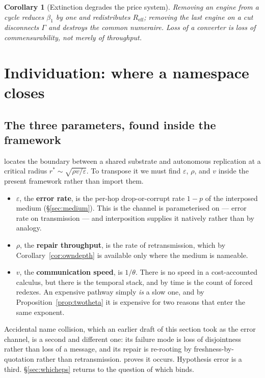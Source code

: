 \documentclass[11pt]{article}
\theoremstyle{plain}
\newtheorem{corollary}[theorem]{Corollary}
\theoremstyle{definition}
\theoremstyle{remark}
\newcommand{\Reff}{R_{\mathrm{eff}}}
\newcommand{\bt}{\beta_1}
\begin{document}
\begin{corollary}[Extinction degrades the price system]
Removing an engine from a cycle reduces $\bt$ by one and redistributes
$\Reff$; removing the last engine on a cut disconnects $\Gamma$ and
destroys the common numeraire. Loss of a converter is loss of
commensurability, not merely of throughput.
\end{corollary}

\section{Individuation: where a namespace closes}
\label{sec:indiv}

\subsection{The three parameters, found inside the framework}

\cite{compaut} locates the boundary between a shared substrate and
autonomous replication at a critical radius $r^\ast \sim
\sqrt{\rho v/\varepsilon}$. To transpose it we must find $\varepsilon$,
$\rho$, and $v$ inside the present framework rather than import them.

\begin{itemize}[itemsep=3pt]
\item $\varepsilon$, the \textbf{error rate}, is the per-hop drop-or-corrupt
rate $1-p$ of the interposed medium (\S\ref{sec:medium}). This is the
channel \cite{compaut} is parameterised on --- error rate on transmission
--- and interposition supplies it natively rather than by analogy.
\item $\rho$, the \textbf{repair throughput}, is the rate of
retransmission, which by Corollary~\ref{cor:owndepth} is available only
where the medium is nameable.
\item $v$, the \textbf{communication speed}, is $1/\theta$. There is no
speed in a cost-accounted calculus, but there is the temporal stack, and by
\cite[Prop.~4.1]{CE} time is the count of forced redexes. An expensive
pathway simply \emph{is} a slow one, and by
Proposition~\ref{prop:twotheta} it is expensive for two reasons that enter
the same exponent.
\end{itemize}

Accidental name collision, which an earlier draft of this section took as
the error channel, is a second and different one: its failure mode is loss
of disjointness rather than loss of a message, and its repair is re-rooting
by freshness-by-quotation rather than retransmission. \cite[\S7]{compose}
proves it occurs. Hypothesis error is a third. \S\ref{sec:whicheps}
returns to the question of which binds.
\end{document}
